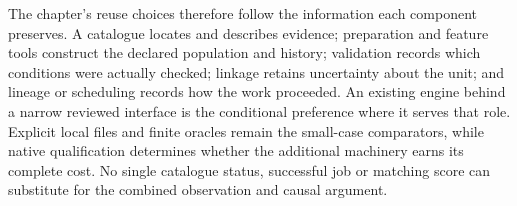 The chapter's reuse choices therefore follow the information each component preserves. A catalogue locates and describes evidence; preparation and feature tools construct the declared population and history; validation records which conditions were actually checked; linkage retains uncertainty about the unit; and lineage or scheduling records how the work proceeded. An existing engine behind a narrow reviewed interface is the conditional preference where it serves that role. Explicit local files and finite oracles remain the small-case comparators, while native qualification determines whether the additional machinery earns its complete cost. No single catalogue status, successful job or matching score can substitute for the combined observation and causal argument.
